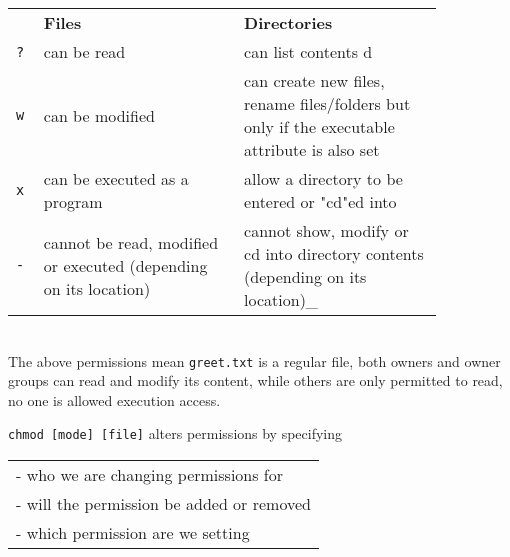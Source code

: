 \documentclass[landscape,a0paper,fontscale=0.285]{baposter} %
\begin{document}
\begin{poster}
{\begin{tabular}{p{0.05\linewidth}p{0.4\linewidth}p{0.4\linewidth}}
\multicolumn{1}{l}{\textbf{}} &
\multicolumn{1}{l}{\textbf{Files}} &
\multicolumn{1}{l}{\textbf{Directories}} \\
\texttt{?} & can be read & can list contents d \\
\texttt{w} & can be modified & can create new files, rename files/folders but only if the executable attribute is also set \\
\texttt{x} & can be executed as a program & allow a directory to be entered or "cd"ed into \\
\texttt{-} & cannot be read, modified or executed (depending on its location) & cannot show, modify or cd into directory contents (depending on its location)_ \\
\end{tabular}\\

The above permissions mean \texttt{\small{greet.txt}} is a regular file, both owners and owner groups can read and modify its content, while others are only permitted to read, no one is allowed execution access.


\texttt{\small{chmod [mode] [file]}} alters permissions by specifying \\

\begin{tabular}{l}
- who we are changing permissions for \\
- will the permission be added or removed \\
- which permission are we setting \\
\end{tabular}

}


\end{poster}
\end{document}
